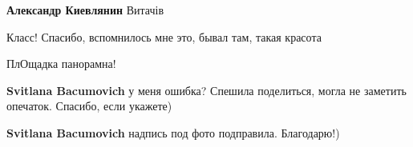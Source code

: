 \begin{itemize}
\begin{itemize}
\textbf{Александр Киевлянин} Витачів

\end{itemize} %

Класс! Спасибо, вспомнилось мне это, бывал там, такая красота

ПлОщадка панорамна!

\begin{itemize} %
\textbf{Svitlana Bacumovich} у меня ошибка? Спешила поделиться, могла не заметить опечаток.
Спасибо, если укажете)

\textbf{Svitlana Bacumovich} надпись под фото подправила. Благодарю!)
\end{itemize} %

\end{itemize} %

